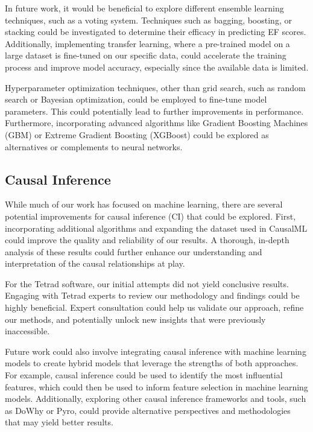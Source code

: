\documentclass[12pt,letterpaper]{article}
\begin{document}
In future work, it would be beneficial to explore different ensemble learning techniques, such as a voting system.
Techniques such as bagging, boosting, or stacking could be investigated to determine their efficacy in predicting \ac{EF} scores.
Additionally, implementing transfer learning, where a pre-trained model on a large dataset is fine-tuned on our specific data, could accelerate the training process and improve model accuracy, especially since the available data is limited.

Hyperparameter optimization techniques, other than grid search, such as random search or Bayesian optimization, could be employed to fine-tune model parameters.
This could potentially lead to further improvements in performance. Furthermore, incorporating advanced algorithms like Gradient Boosting Machines (GBM) or Extreme Gradient Boosting (XGBoost) could be explored as alternatives or complements to neural networks.

\subsection{Causal Inference}

While much of our work has focused on machine learning, there are several potential improvements for causal inference (\ac{CI}) that could be explored. First, incorporating additional algorithms and expanding the dataset used in CausalML could improve the quality and reliability of our results.
A thorough, in-depth analysis of these results could further enhance our understanding and interpretation of the causal relationships at play.

For the Tetrad software, our initial attempts did not yield conclusive results.
Engaging with Tetrad experts to review our methodology and findings could be highly beneficial.
Expert consultation could help us validate our approach, refine our methods, and potentially unlock new insights that were previously inaccessible.

Future work could also involve integrating causal inference with machine learning models to create hybrid models that leverage the strengths of both approaches.
For example, causal inference could be used to identify the most influential features, which could then be used to inform feature selection in machine learning models.
Additionally, exploring other causal inference frameworks and tools, such as DoWhy or Pyro, could provide alternative perspectives and methodologies that may yield better results.
\end{document}
